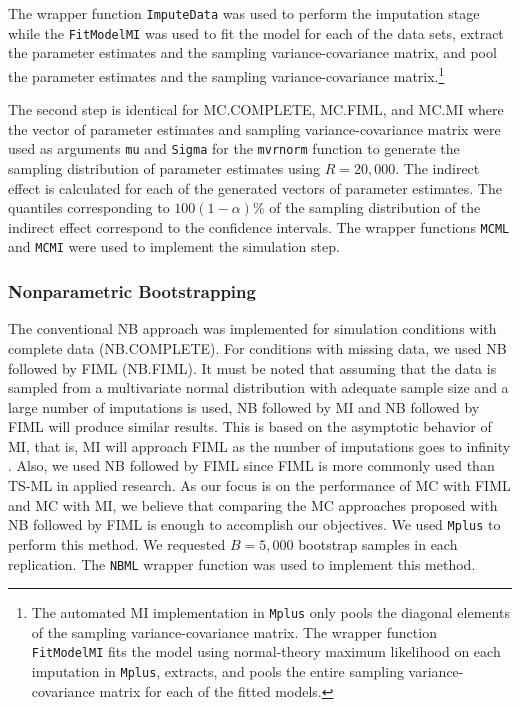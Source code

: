 \documentclass[man]{apa7}\usepackage[]{graphicx}\usepackage[]{xcolor}
\begin{document}






\noindent The wrapper function \texttt{ImputeData} was used to perform the imputation stage while the \texttt{FitModelMI}
was used to fit the model for each of the data sets,
extract the parameter estimates and the sampling variance-covariance matrix,
and pool the parameter estimates and the sampling variance-covariance matrix.\footnote{The automated MI implementation in \texttt{Mplus} only pools the diagonal elements of the sampling variance-covariance matrix.
The wrapper function \texttt{FitModelMI} fits the model using normal-theory maximum likelihood on each imputation in \texttt{Mplus},
extracts, and pools the entire sampling variance-covariance matrix for each of the fitted models.}

The second step is identical for MC.COMPLETE,
MC.FIML,
and MC.MI
where the vector of parameter estimates and sampling variance-covariance matrix
were used as arguments \texttt{mu} and \texttt{Sigma} for the \texttt{mvrnorm} function
to generate the sampling distribution of parameter estimates using $R = 20,000$.
The indirect effect is calculated for each of the generated vectors of parameter estimates. 
The quantiles corresponding to $100 \left(1 - \alpha \right) \%$ of the sampling distribution of the indirect effect correspond to the confidence intervals.
The wrapper functions \texttt{MCML} and \texttt{MCMI} were used to implement the simulation step.

\subsubsection{Nonparametric Bootstrapping}

The conventional NB approach was implemented for simulation conditions with complete data (NB.COMPLETE).
For conditions with missing data,
we used NB followed by FIML (NB.FIML).
It must be noted that assuming that the data is sampled from a multivariate normal distribution with adequate sample size
and a large number of imputations is used,
NB followed by MI and NB followed by FIML will produce similar results.
This is based on the asymptotic behavior of MI,
that is,
MI will approach FIML as the number of imputations goes to infinity
\parencite{Lib-Missing-Data-Multiple-Imputation-Graham-2007}.
Also,
we used NB followed by FIML since FIML is more commonly used than TS-ML in applied research.
As our focus is on the performance of MC with FIML and MC with MI,
we believe that comparing the MC approaches proposed with NB followed by FIML
is enough to accomplish our objectives.
We used \texttt{Mplus} to perform this method.
We requested $B = 5,000$ bootstrap samples in each replication.
The \texttt{NBML} wrapper function was used to implement this method.
\end{document}
